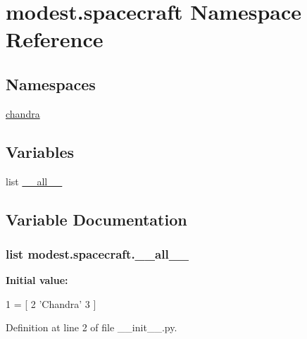 \hypertarget{namespacemodest_1_1spacecraft}{}\section{modest.\+spacecraft Namespace Reference}
\label{namespacemodest_1_1spacecraft}
\subsection*{Namespaces}
\begin{DoxyCompactItemize}
\item 
 \hyperlink{namespacemodest_1_1spacecraft_1_1chandra}{chandra}
\end{DoxyCompactItemize}
\subsection*{Variables}
\begin{DoxyCompactItemize}
\item 
list \hyperlink{namespacemodest_1_1spacecraft_a75dc3ff9c9f0072247d38063ad9e1914}{\+\_\+\+\_\+all\+\_\+\+\_\+}
\end{DoxyCompactItemize}


\subsection{Variable Documentation}
\subsubsection[{\texorpdfstring{\+\_\+\+\_\+all\+\_\+\+\_\+}{__all__}}]{\setlength{\rightskip}{0pt plus 5cm}list modest.\+spacecraft.\+\_\+\+\_\+all\+\_\+\+\_\+\hspace{0.3cm}{\ttfamily [private]}}\hypertarget{namespacemodest_1_1spacecraft_a75dc3ff9c9f0072247d38063ad9e1914}{}\label{namespacemodest_1_1spacecraft_a75dc3ff9c9f0072247d38063ad9e1914}
{\bfseries Initial value\+:}
\begin{DoxyCode}
1 = [
2     \textcolor{stringliteral}{'Chandra'}
3 ]
\end{DoxyCode}


Definition at line 2 of file \+\_\+\+\_\+init\+\_\+\+\_\+.\+py.

